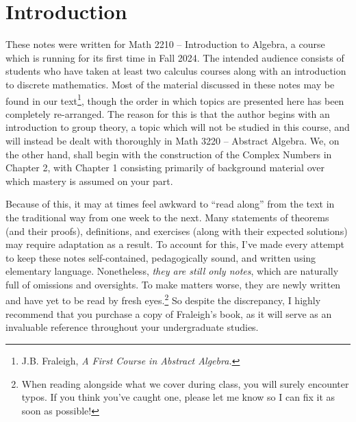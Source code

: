 \documentclass[11pt,fleqn,dvipsnames,usenames]{article}
\renewcommand{\headrulewidth}{1pt}
\newcommand{\p}{\noindent}
\begin{document}
\fancyhead[R]{\term}
\renewcommand{\headrulewidth}{0.4pt}


\setcounter{section}{0}

\section*{Introduction}

\p These notes were written for Math 2210 -- Introduction to Algebra, a course which is running for its first time in Fall 2024.  The intended audience consists of students who have taken at least two calculus courses along with an introduction to discrete mathematics.  Most of the material discussed in these notes may be found in our text\footnote{J.B. Fraleigh, \emph{A First Course in Abstract Algebra.}}, though the order in which topics are presented here has been completely re-arranged.  The reason for this is that the author begins with an introduction to group theory, a topic which will not be studied in this course, and will instead be dealt with thoroughly in Math 3220 -- Abstract Algebra.  We, on the other hand, shall begin with the construction of the Complex Numbers in Chapter 2, with Chapter 1 consisting primarily of background material over which mastery is assumed on your part.
\vsp

\p Because of this, it may at times feel awkward to ``read along'' from the text in the traditional way from one week to the next.  Many statements of theorems (and their proofs), definitions, and exercises (along with their expected solutions) may require adaptation as a result.  To account for this, I've made every attempt to keep these notes self-contained, pedagogically sound, and written using elementary language.  Nonetheless, \emph{they are still only notes}, which are naturally full of omissions and oversights.  To make matters worse, they are newly written and have yet to be read by fresh eyes.\footnote{When reading alongside what we cover during class, you will surely encounter typos.  If you think you've caught one, please let me know so I can fix it as soon as possible!}  So despite the discrepancy, I highly recommend that you purchase a copy of Fraleigh's book, as it will serve as an invaluable reference throughout your undergraduate studies.
\vsp
\end{document}
